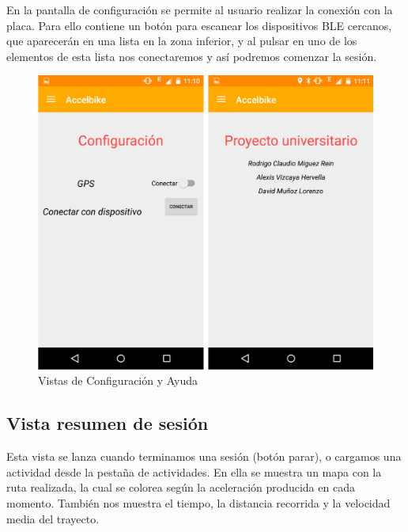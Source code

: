 En la pantalla de configuración se permite al usuario realizar la conexión con la placa. Para ello contiene un botón para escanear los dispositivos BLE cercanos, que aparecerán en una lista en la zona inferior, y al pulsar en uno de los elementos de esta lista nos conectaremos y así podremos comenzar la sesión.

\begin{figure}[h]%
	\centering
    \includegraphics[scale=0.2]{figures/app_config_ayuda.png} %
    \caption[Vista de configuración y de ayuda]{Vistas de Configuración y Ayuda}
   	\label{figuraAPPConfigAyuda}
\end{figure}

\subsection{Vista resumen de sesión}
\label{makereference6.1.3}

Esta vista se lanza cuando terminamos una sesión (botón parar), o cargamos una actividad desde la pestaña de actividades. En ella se muestra un mapa con la ruta realizada, la cual se colorea según la aceleración producida en cada momento. También nos muestra el tiempo, la distancia recorrida y la velocidad media del trayecto.

